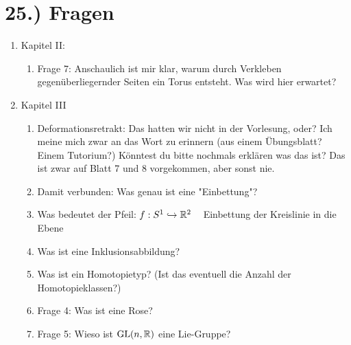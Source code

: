 \documentclass[a5paper,oneside]{scrbook}
\begin{document}
\section*{25.) Fragen}
\begin{enumerate}
  \item Kapitel II:
  \begin{enumerate}
    \item Frage 7: Anschaulich ist mir klar, warum durch Verkleben gegenüberliegernder Seiten ein Torus entsteht. Was wird hier erwartet?
  \end{enumerate}
  \item Kapitel III
  \begin{enumerate}
    \item Deformationsretrakt: Das hatten wir nicht in der Vorlesung, oder? Ich meine mich zwar an das Wort zu erinnern (aus einem Übungsblatt? Einem Tutorium?) Könntest du bitte nochmals erklären was das ist?
Das ist zwar auf Blatt 7 und 8 vorgekommen, aber sonst nie.
    \item Damit verbunden: Was genau ist eine "Einbettung"? 
    \item Was bedeutet der Pfeil: $f:S^1 \hookrightarrow \mathbb{R}^2\;\;\;$ Einbettung der Kreislinie in die Ebene
    \item Was ist eine Inklusionsabbildung?
    \item Was ist ein Homotopietyp? (Ist das eventuell die Anzahl der Homotopieklassen?)
    \item Frage 4: Was ist eine Rose?
    \item Frage 5: Wieso ist $\mathrm{GL}(n, \mathbb{R})$ eine Lie-Gruppe?
  \end{enumerate}
\end{enumerate}
\end{document}
